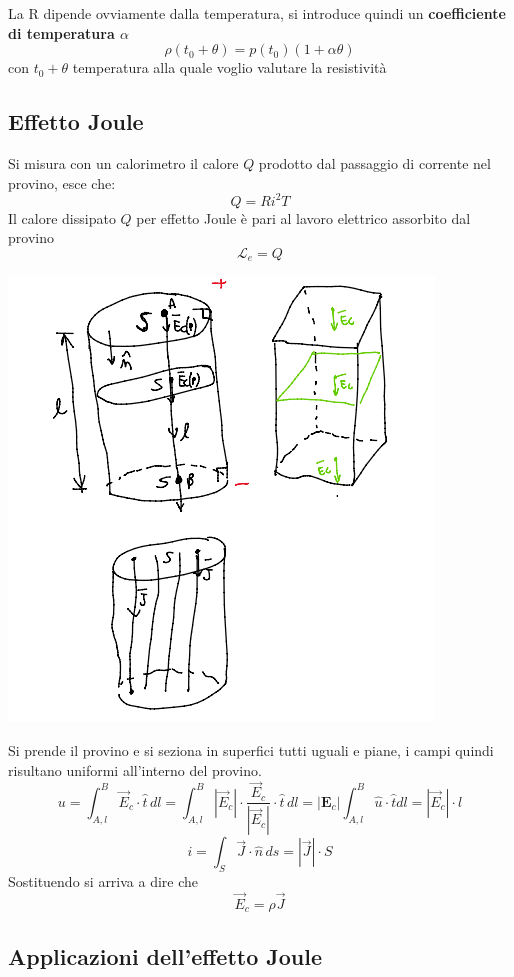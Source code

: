 La R dipende ovviamente dalla temperatura, si introduce quindi un \textbf{coefficiente di temperatura $\alpha$}
\[
    \rho(t_0+\theta) = p(t_0)(1+\alpha\theta)
\]
con $t_0 + \theta$ temperatura alla quale voglio valutare la resistività

\subsection{Effetto Joule}

Si misura con un calorimetro il calore $Q$ prodotto dal passaggio di corrente nel provino, esce che:
\[
Q = R i^2T
\]
Il calore dissipato $Q$ per effetto Joule è pari al lavoro elettrico assorbito dal provino
\[
\mathcal{L}_e = Q
\]
\begin{center}
    \includegraphics[scale = 0.5]{immagini/image11.png}
\end{center}
Si prende il provino e si seziona in superfici tutti uguali e piane, i campi quindi risultano uniformi all'interno del provino.
\[
u = \int_{A,l}^{B} \vec{E}_c \cdot \hat{t}  \, dl = \int_{A,l}^{B} |\vec{E}_c| \cdot \frac{\vec{E}_c}{|\vec{E}_c|} \cdot \hat{t}  \, dl = |\mathbf{E}_c|  \int_{A,l}^{B}\hat{u}\cdot\hat{t}dl = |\vec{E}_c|\cdot l
\]
\[
i = \int_S \vec{J}\cdot\hat{n} \, ds = |\vec{J}|\cdot S
\]
Sostituendo si arriva a dire che
\[
    \vec{E}_c = \rho\vec{J}
\]

\subsection*{Applicazioni dell'effetto Joule}

